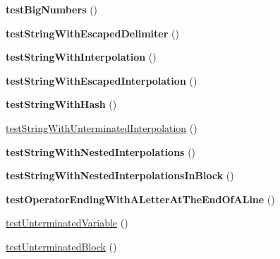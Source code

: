 \begin{DoxyCompactItemize}
\item 
{\bfseries test\+Big\+Numbers} ()\hypertarget{classTwig__Tests__LexerTest_a5cd2869fc9eccc58b23034b7f4b12708}{}\label{classTwig__Tests__LexerTest_a5cd2869fc9eccc58b23034b7f4b12708}

\item 
{\bfseries test\+String\+With\+Escaped\+Delimiter} ()\hypertarget{classTwig__Tests__LexerTest_ac7029159f6627318ba092073ae9701ea}{}\label{classTwig__Tests__LexerTest_ac7029159f6627318ba092073ae9701ea}

\item 
{\bfseries test\+String\+With\+Interpolation} ()\hypertarget{classTwig__Tests__LexerTest_a9d73fc5bea9908d23b9e693f2465e5e0}{}\label{classTwig__Tests__LexerTest_a9d73fc5bea9908d23b9e693f2465e5e0}

\item 
{\bfseries test\+String\+With\+Escaped\+Interpolation} ()\hypertarget{classTwig__Tests__LexerTest_a0efe8c641d01083e22a02ade1252af6b}{}\label{classTwig__Tests__LexerTest_a0efe8c641d01083e22a02ade1252af6b}

\item 
{\bfseries test\+String\+With\+Hash} ()\hypertarget{classTwig__Tests__LexerTest_a2ffdab4caa44cd6517f2bf77d2505f26}{}\label{classTwig__Tests__LexerTest_a2ffdab4caa44cd6517f2bf77d2505f26}

\item 
\hyperlink{classTwig__Tests__LexerTest_ade082a750f40f5c240667c1969c816f4}{test\+String\+With\+Unterminated\+Interpolation} ()
\item 
{\bfseries test\+String\+With\+Nested\+Interpolations} ()\hypertarget{classTwig__Tests__LexerTest_ab6ad0a30a635e304571d81b268a94ac6}{}\label{classTwig__Tests__LexerTest_ab6ad0a30a635e304571d81b268a94ac6}

\item 
{\bfseries test\+String\+With\+Nested\+Interpolations\+In\+Block} ()\hypertarget{classTwig__Tests__LexerTest_a5555d4c0ad552dee472c485d6b87045b}{}\label{classTwig__Tests__LexerTest_a5555d4c0ad552dee472c485d6b87045b}

\item 
{\bfseries test\+Operator\+Ending\+With\+A\+Letter\+At\+The\+End\+Of\+A\+Line} ()\hypertarget{classTwig__Tests__LexerTest_a01d11fc919baf8aab69e4dfcb53689a9}{}\label{classTwig__Tests__LexerTest_a01d11fc919baf8aab69e4dfcb53689a9}

\item 
\hyperlink{classTwig__Tests__LexerTest_ac64d1752da7d18b635ba5fc097863e92}{test\+Unterminated\+Variable} ()
\item 
\hyperlink{classTwig__Tests__LexerTest_a9cce8fbe807d273724c5adfcadaea415}{test\+Unterminated\+Block} ()
\end{DoxyCompactItemize}
